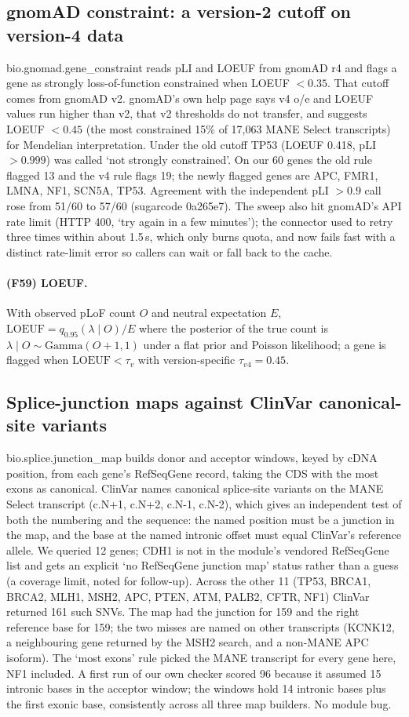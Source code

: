 \subsection{gnomAD constraint: a version-2 cutoff on version-4 data}
bio.gnomad.gene\_constraint reads pLI and LOEUF from gnomAD r4 and flags a gene as strongly loss-of-function constrained when LOEUF $<0.35$. That cutoff comes from gnomAD v2. gnomAD's own help page says v4 o/e and LOEUF values run higher than v2, that v2 thresholds do not transfer, and suggests LOEUF $<0.45$ (the most constrained 15\% of 17,063 MANE Select transcripts) for Mendelian interpretation. Under the old cutoff TP53 (LOEUF 0.418, pLI $>0.999$) was called `not strongly constrained'. On our 60 genes the old rule flagged 13 and the v4 rule flags 19; the newly flagged genes are APC, FMR1, LMNA, NF1, SCN5A, TP53. Agreement with the independent pLI $>0.9$ call rose from 51/60 to 57/60 (sugarcode 0a265e7). The sweep also hit gnomAD's API rate limit (HTTP 400, `try again in a few minutes'); the connector used to retry three times within about 1.5\,s, which only burns quota, and now fails fast with a distinct rate-limit error so callers can wait or fall back to the cache.
\paragraph{(F59) LOEUF.} With observed pLoF count $O$ and neutral expectation $E$, $\mathrm{LOEUF}=q_{0.95}(\lambda\mid O)/E$ where the posterior of the true count is $\lambda\mid O\sim\mathrm{Gamma}(O+1,1)$ under a flat prior and Poisson likelihood; a gene is flagged when $\mathrm{LOEUF}<\tau_{v}$ with version-specific $\tau_{v4}=0.45$.
\subsection{Splice-junction maps against ClinVar canonical-site variants}
bio.splice.junction\_map builds donor and acceptor windows, keyed by cDNA position, from each gene's RefSeqGene record, taking the CDS with the most exons as canonical. ClinVar names canonical splice-site variants on the MANE Select transcript (c.N+1, c.N+2, c.N-1, c.N-2), which gives an independent test of both the numbering and the sequence: the named position must be a junction in the map, and the base at the named intronic offset must equal ClinVar's reference allele. We queried 12 genes; CDH1 is not in the module's vendored RefSeqGene list and gets an explicit `no RefSeqGene junction map' status rather than a guess (a coverage limit, noted for follow-up). Across the other 11 (TP53, BRCA1, BRCA2, MLH1, MSH2, APC, PTEN, ATM, PALB2, CFTR, NF1) ClinVar returned 161 such SNVs. The map had the junction for 159 and the right reference base for 159; the two misses are named on other transcripts (KCNK12, a neighbouring gene returned by the MSH2 search, and a non-MANE APC isoform). The `most exons' rule picked the MANE transcript for every gene here, NF1 included. A first run of our own checker scored 96 because it assumed 15 intronic bases in the acceptor window; the windows hold 14 intronic bases plus the first exonic base, consistently across all three map builders. No module bug.
